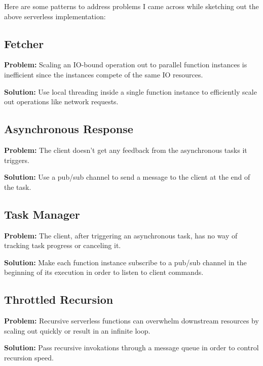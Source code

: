 Here are some patterns to address problems I came across while sketching out the above serverless implementation:

\subsection{Fetcher} \label{subsec:Fetcher}

\textbf{Problem:} Scaling an IO-bound operation out to parallel function instances is inefficient since the instances compete of the same IO resources.

\textbf{Solution:} Use local threading inside a single function instance to efficiently scale out operations like network requests.

\subsection{Asynchronous Response} \label{subsec:AsyncResponse}

\textbf{Problem:} The client doesn't get any feedback from the asynchronous tasks it triggers.

\textbf{Solution:} Use a pub/sub channel to send a message to the client at the end of the task.

\subsection{Task Manager} \label{subsec:taskManager}

\textbf{Problem:} The client, after triggering an asynchronous task, has no way of tracking task progress or canceling it.

\textbf{Solution:} Make each function instance subscribe to a pub/sub channel in the beginning of its execution in order to listen to client commands.

\subsection{Throttled Recursion} \label{subsec:throttledRecursion}

\textbf{Problem:} Recursive serverless functions can overwhelm downstream resources by scaling out quickly or result in an infinite loop.

\textbf{Solution:} Pass recursive invokations through a message queue in order to control recursion speed.
